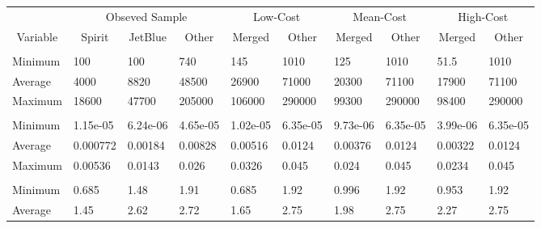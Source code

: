 
\begin{tabular}[t]{llllllllll}
\toprule
\multicolumn{1}{c}{ } & \multicolumn{3}{c}{Obseved Sample} & \multicolumn{2}{c}{Low-Cost} & \multicolumn{2}{c}{Mean-Cost} & \multicolumn{2}{c}{High-Cost} \\
\cmidrule(l{3pt}r{3pt}){2-4} \cmidrule(l{3pt}r{3pt}){5-6} \cmidrule(l{3pt}r{3pt}){7-8} \cmidrule(l{3pt}r{3pt}){9-10}
\multicolumn{1}{c}{Variable} & \multicolumn{1}{c}{Spirit} & \multicolumn{1}{c}{JetBlue} & \multicolumn{1}{c}{Other} & \multicolumn{1}{c}{Merged} & \multicolumn{1}{c}{Other} & \multicolumn{1}{c}{Merged} & \multicolumn{1}{c}{Other} & \multicolumn{1}{c}{Merged} & \multicolumn{1}{c}{Other} \\
\cmidrule(l{3pt}r{3pt}){1-1} \cmidrule(l{3pt}r{3pt}){2-2} \cmidrule(l{3pt}r{3pt}){3-3} \cmidrule(l{3pt}r{3pt}){4-4} \cmidrule(l{3pt}r{3pt}){5-5} \cmidrule(l{3pt}r{3pt}){6-6} \cmidrule(l{3pt}r{3pt}){7-7} \cmidrule(l{3pt}r{3pt}){8-8} \cmidrule(l{3pt}r{3pt}){9-9} \cmidrule(l{3pt}r{3pt}){10-10}
\addlinespace[0.3em]
\multicolumn{10}{l}{\textbf{Passengers}}\\
\hspace{1em}Minimum & 100 & 100 & 740 & 145 & 1010 & 125 & 1010 & 51.5 & 1010\\
\hspace{1em}Average & 4000 & 8820 & 48500 & 26900 & 71000 & 20300 & 71100 & 17900 & 71100\\
\hspace{1em}Maximum & 18600 & 47700 & 205000 & 106000 & 290000 & 99300 & 290000 & 98400 & 290000\\
\addlinespace[0.3em]
\multicolumn{10}{l}{\textbf{Market Share}}\\
\hspace{1em}Minimum & 1.15e-05 & 6.24e-06 & 4.65e-05 & 1.02e-05 & 6.35e-05 & 9.73e-06 & 6.35e-05 & 3.99e-06 & 6.35e-05\\
\hspace{1em}Average & 0.000772 & 0.00184 & 0.00828 & 0.00516 & 0.0124 & 0.00376 & 0.0124 & 0.00322 & 0.0124\\
\hspace{1em}Maximum & 0.00536 & 0.0143 & 0.026 & 0.0326 & 0.045 & 0.024 & 0.045 & 0.0234 & 0.045\\
\addlinespace[0.3em]
\multicolumn{10}{l}{\textbf{Prices}}\\
\hspace{1em}Minimum & 0.685 & 1.48 & 1.91 & 0.685 & 1.92 & 0.996 & 1.92 & 0.953 & 1.92\\
\hspace{1em}Average & 1.45 & 2.62 & 2.72 & 1.65 & 2.75 & 1.98 & 2.75 & 2.27 & 2.75\\

\end{tabular}
